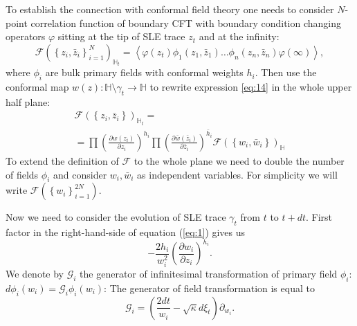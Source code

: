 \documentclass[12pt]{article}
\begin{document}
To establish the connection with conformal field theory one needs to
consider $N$-point correlation function of boundary CFT with boundary
condition changing operators $\varphi$ sitting at the tip of SLE trace
$z_t$ and at the infinity:
\begin{equation}
  \mathcal{F}(\left\{z_{i},\bar z_{i}\right\}_{i=1}^{N})_{\mathbb{H}_{t}}=
\left<\varphi(z_{t}) \phi_{1}(z_{1},\bar z_{1}) \dots \phi_{n}(z_{n},\bar z_{n})
      \varphi(\infty)\right>,
    \label{eq:14}
\end{equation}
where $\phi_{i}$ are bulk primary fields with conformal weights $h_i$.
Then use the conformal map  $w(z):\mathbb{H}\setminus\gamma_{t}\to \mathbb{H}$ to rewrite expression \eqref{eq:14} in the whole upper half plane:
\begin{multline}
  \mathcal{F}(\left\{z_{i},\bar z_{i}\right\})_{\mathbb{H}_{t}}=\\
  =\prod \left(\frac{\partial w(z_{i})}{\partial z_{i}}\right)^{h_{i}} 
  \prod \left(\frac{\partial \bar w(\bar z_{i})}{\partial \bar z_{i}}\right)^{\bar h_i}
  \mathcal{F}(\left\{w_{i}, \bar w_{i}\right\})_{\mathbb{H}}
  \label{eq:4}
\end{multline}
To extend the definition of $\mathcal{F}$ to the whole plane we need
to double the number of fields $\phi_{i}$
\cite{cardy2004boundary,cardy1984conformal} and consider $w_{i},\bar
w_{i}$ as independent variables. For simplicity we will write
$\mathcal{F}(\left\{w_{i}\right\}_{i=1}^{2N})$.

Now we need to consider the evolution of SLE trace $\gamma_{t}$ from  $t$ to $t+ dt$. First factor in the right-hand-side of equation (\ref{eq:1}) gives us
\begin{equation*}
  -\frac{2h_{i}}{w_{i}^{2}}\left(\frac{\partial w_{i}}{\partial z_{i}}\right)^{h_{i}}.
\end{equation*}
We denote by $\mathcal{G}_{i}$ the generator of infinitesimal
transformation of primary field $\phi_{i}$:$d\phi_{i}(w_{i}) =
\mathcal{G}_{i}\phi_{i}(w_{i})$:
 The generator of field transformation is equal to
\begin{equation}
  \mathcal{G}_{i}=\left(\frac{2dt}{w_{i}}-\sqrt{\kappa} d\xi_{t}\right) \partial_{w_{i}}.
  \label{eq:11}
\end{equation}
\end{document}
